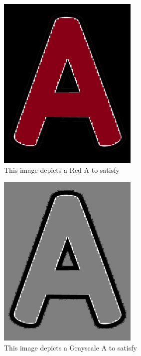 \documentclass[12pt, titlepage]{article}
\begin{document}
\begin{figure}[h!]
  \begin{center}
    \includegraphics[width=0.6\textwidth]{RedA}
  \caption{This image depicts a Red A to satisfy}
  \label{Fig_redA} 
  \end{center}
  \end{figure}

\begin{figure}[h!]
  \begin{center}
    \includegraphics[width=0.6\textwidth]{GrayA}
  \caption{This image depicts a Grayscale A to satisfy}
  \label{Fig_grayA} 
  \end{center}
  \end{figure}
\end{document}
